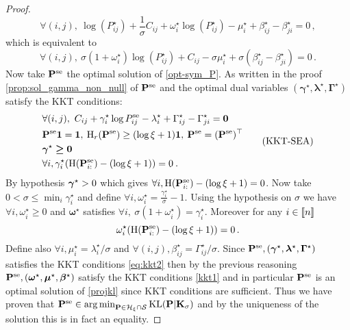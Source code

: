 \begin{proof}
\begin{equation}
\forall (i,j), \ \log(P^\star_{ij}) + \frac{1}{\sigma} C_{ij}+ \omega_i^\star \log(P^\star_{ij}) -\mu^\star_i+\beta_{ij}^\star-\beta_{ji}^\star = 0\,,
\end{equation}
which is equivalent to 
\begin{equation}
\forall (i,j), \ \sigma(1+\omega_i^\star)\log(P^\star_{ij}) + C_{ij} -\sigma \mu^\star_i+\sigma(\beta_{ij}^\star-\beta_{ji}^\star) = 0\,.
\end{equation}
Now take ${\mathbf{P}}^{\mathrm{se}}$ the optimal solution of \eqref{opt-sym_P}. As written in the proof \cref{prop:sol_gamma_non_null} of  ${\mathbf{P}}^{\mathrm{se}}$ and the optimal dual variables $(\bm{\gamma}^\star, \bm{\lambda}^\star, \bm{\Gamma}^\star)$ satisfy the KKT conditions:
\begin{equation}
\label{eq:kkt2}
    \begin{aligned}
    &\forall (i,j), \ C_{ij} + \gamma_i^\star\log{P^{\mathrm{se}}_{ij}} - \lambda_i^\star + \Gamma^\star_{ij}-\Gamma^\star_{ji} = \bm{0} \\
    &{\mathbf{P}}^{\mathrm{se}} \bm{1} = \bm{1}, \: \operatorname{H}_r({\mathbf{P}}^{\mathrm{se}}) \geq (\log{\xi} + 1)\bm{1}, \: {\mathbf{P}}^{\mathrm{se}} = ({\mathbf{P}}^{\mathrm{se}})^\top \\
    &\bm{\gamma}^\star \bm{\geq} \bm{0} \\
    &\forall i, \gamma_i^\star (\operatorname{H}({\mathbf{P}}^{\mathrm{se}}_{i:}) - (\log{\xi} + 1)) = 0\:.
\end{aligned}
\tag{KKT-SEA}
\end{equation}
By hypothesis $\boldsymbol{\gamma}^\star > 0$ which gives $\forall i, \operatorname{H}({\mathbf{P}}^{\mathrm{se}}_{i:}) - (\log{\xi} + 1) = 0$. Now take $0 < \sigma \leq \min_i \gamma^\star_i$ and define $\forall i, \omega_i^\star = \frac{\gamma_i^\star}{\sigma} -1$. Using the hypothesis on $\sigma$ we have $\forall i, \omega_i^\star \geq 0$ and $\bm{\omega}^\star$ satisfies $\forall i, \ \sigma(1+\omega^\star_i) = \gamma_{i}^\star$. Moreover for any $i \in {[\![n]\!]}$
\begin{equation}
\omega_i^\star(\operatorname{H}({\mathbf{P}}^{\mathrm{se}}_{i:}) - (\log{\xi} + 1)) = 0 \,.
\end{equation}
Define also $\forall i, \mu_i^\star = \lambda_i^\star/\sigma$ and $\forall (i,j), \beta_{ij}^\star = \Gamma_{ij}^\star/\sigma$. Since ${\mathbf{P}}^{\mathrm{se}}, (\bm{\gamma}^\star, \bm{\lambda}^\star, \bm{\Gamma}^\star)$ satisfies the KKT conditions \eqref{eq:kkt2} then by the previous reasoning ${\mathbf{P}}^{\mathrm{se}}, (\bm{\omega}^\star, \bm{\mu}^\star, \bm{\beta}^\star)$ satisfy the KKT conditions \eqref{kkt1} and in particular ${\mathbf{P}}^{\mathrm{se}}$ is an optimal solution of \eqref{projkl} since KKT conditions are sufficient. Thus we have proven that ${\mathbf{P}}^{\mathrm{se}} \in \operatorname*{arg\,min}_{{\mathbf{P}} \in \mathcal{H}_{\xi} \cap \mathcal{S}} \operatorname{KL}({\mathbf{P}} | \mathbf{K}_\sigma)$ and by the uniqueness of the solution this is in fact an equality.
\end{proof}


